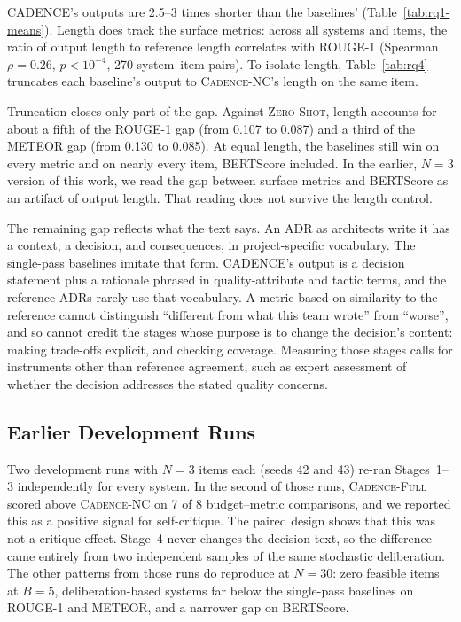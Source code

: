 \documentclass[preprint,12pt,authoryear]{elsarticle}
\newcommand{\sysZS}{\textsc{Zero-Shot}}
\newcommand{\sysNC}{\textsc{Cadence-NC}}
\newcommand{\sysFull}{\textsc{Cadence-Full}}
\renewcommand{\_}{\textunderscore\allowbreak{}}
\begin{document}
CADENCE's outputs are 2.5--3 times shorter than the baselines' (Table~\ref{tab:rq1-means}). Length does track the surface metrics: across all systems and items, the ratio of output length to reference length correlates with ROUGE-1 (Spearman $\rho=0.26$, $p<10^{-4}$, 270 system--item pairs). To isolate length, Table~\ref{tab:rq4} truncates each baseline's output to \sysNC{}'s length on the same item.

Truncation closes only part of the gap. Against \sysZS{}, length accounts for about a fifth of the ROUGE-1 gap (from 0.107 to 0.087) and a third of the METEOR gap (from 0.130 to 0.085). At equal length, the baselines still win on every metric and on nearly every item, BERTScore included. In the earlier, $N=3$ version of this work, we read the gap between surface metrics and BERTScore as an artifact of output length. That reading does not survive the length control.

The remaining gap reflects what the text says. An ADR as architects write it has a context, a decision, and consequences, in project-specific vocabulary. The single-pass baselines imitate that form. CADENCE's output is a decision statement plus a rationale phrased in quality-attribute and tactic terms, and the reference ADRs rarely use that vocabulary. A metric based on similarity to the reference cannot distinguish ``different from what this team wrote'' from ``worse'', and so cannot credit the stages whose purpose is to change the decision's content: making trade-offs explicit, and checking coverage. Measuring those stages calls for instruments other than reference agreement, such as expert assessment of whether the decision addresses the stated quality concerns.

\subsection{Earlier Development Runs}
\label{sec:eval-earlier}

Two development runs with $N=3$ items each (seeds 42 and 43) re-ran Stages~1--3 independently for every system. In the second of those runs, \sysFull{} scored above \sysNC{} on 7 of 8 budget--metric comparisons, and we reported this as a positive signal for self-critique. The paired design shows that this was not a critique effect. Stage~4 never changes the decision text, so the difference came entirely from two independent samples of the same stochastic deliberation. The other patterns from those runs do reproduce at $N=30$: zero feasible items at $B=5$, deliberation-based systems far below the single-pass baselines on ROUGE-1 and METEOR, and a narrower gap on BERTScore.
\end{document}

